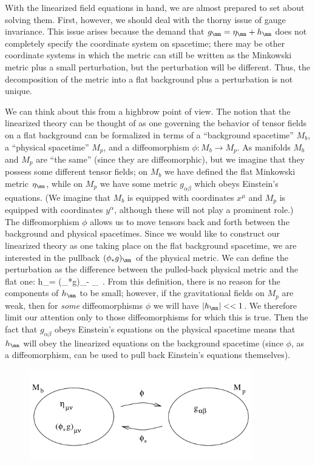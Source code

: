 \documentclass[12pt]{article}
\begin{document}
With the linearized field equations in hand, we are almost prepared
to set about solving them.  First, however, we should deal with the
thorny issue of gauge invariance.  This issue arises because the
demand that $g_\mn=\eta_\mn+h_\mn$ does not completely specify the
coordinate system on spacetime; there may be other coordinate systems
in which the metric can still be written as the Minkowski metric
plus a small perturbation, but the perturbation will be different.  
Thus, the decomposition of the metric into a flat background plus a
perturbation is not unique.

We can think about this from a highbrow point of view.  The notion
that the linearized theory can be thought of as one governing the
behavior of tensor fields on a flat background can be formalized in
terms of a ``background spacetime'' $M_b$, a ``physical spacetime''
$M_p$, and a diffeomorphism $\phi:M_b\rightarrow M_p$.  As manifolds
$M_b$ and $M_p$ are ``the same'' (since they are diffeomorphic), but
we imagine that they possess some different tensor fields;
on $M_b$ we have defined the flat Minkowski metric $\eta_\mn$, while
on $M_p$ we have some metric $g_{\alpha\beta}$ which obeys Einstein's
equations.  (We imagine that $M_b$ is equipped with coordinates
$x^\mu$ and $M_p$ is equipped with coordinates $y^\alpha$, although
these will not play a prominent role.)
The diffeomorphism $\phi$ allows us to move tensors back
and forth between the background and physical spacetimes.  Since we
would like to construct our linearized theory as one taking place 
on the flat background spacetime, we are interested in the pullback
$(\phi_*g)_\mn$ of the physical metric.  We can define the perturbation
as the difference between the pulled-back physical metric and the
flat one:
\be
  h_\mn = (\phi_*g)_\mn - \eta_\mn\ .\label{6.10}
\ee
From this definition, there is no reason for the components of $h_\mn$
to be small; however, if the gravitational fields on $M_p$ are weak,
then for {\it some} diffeomorphisms $\phi$ we will have $|h_\mn| << 1$.
We therefore limit our attention only to those diffeomorphisms for which
this is true.  Then the fact that $g_{\alpha\beta}$ obeys Einstein's
equations on the physical spacetime means that $h_\mn$ will obey
the linearized equations on the background spacetime (since $\phi$,
as a diffeomorphism, can be used to pull back Einstein's equations
themselves).

\begin{figure}[h]
  \centerline{
  \includegraphics[height=4cm]{pdf/six1}}
\end{figure}
\end{document}
